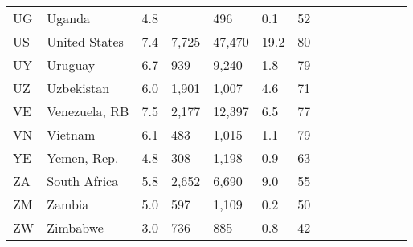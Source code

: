 \begin{scriptsize}
\begin{center}
\begin{longtable}{llllllllllllll}
UG&Uganda&4.8&&496&0.1&52\\
US&United States&7.4&7,725&47,470&19.2&80\\
UY&Uruguay&6.7&939&9,240&1.8&79\\
UZ&Uzbekistan&6.0&1,901&1,007&4.6&71\\
VE&Venezuela, RB&7.5&2,177&12,397&6.5&77\\
VN&Vietnam&6.1&483&1,015&1.1&79\\
YE&Yemen, Rep.&4.8&308&1,198&0.9&63\\
ZA&South Africa&5.8&2,652&6,690&9.0&55\\
ZM&Zambia&5.0&597&1,109&0.2&50\\
ZW&Zimbabwe&3.0&736&885&0.8&42\\
\end{longtable} \end{center} \end{scriptsize}   
